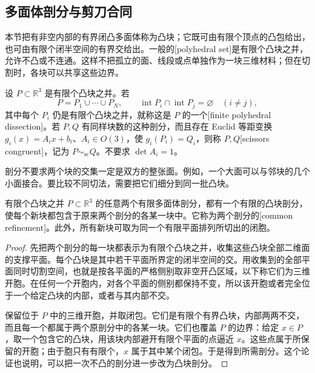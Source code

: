 \subsection{多面体剖分与剪刀合同}
\label{g1:subsec:E05:01}

本节把有非空内部的有界闭凸多面体称为凸块；它既可由有限个顶点的凸包给出，也可由有限个闭半空间的有界交给出。一般的[polyhedral set]是有限个凸块之并，允许不凸或不连通。这样不把孤立的面、线段或点单独作为一块三维材料；但在切割时，各块可以共享这些边界。

\begin{definition}
	\label{g1:def:polyhedral-scissors-congruence}
	设 \(P\subset\mathbb R^3\) 是有限个凸块之并。若
	\[
		P=P_1\cup\cdots\cup P_N,
		\qquad \operatorname{int}P_i\cap\operatorname{int}P_j=\varnothing
		\quad(i\ne j),
	\]
	其中每个 \(P_i\) 仍是有限个凸块之并，就称这是 \(P\) 的一个[finite polyhedral dissection]。若 \(P,Q\) 有同样块数的这种剖分，而且存在 Euclid 等距变换 \(g_i(x)=A_ix+b_i\)、\(A_i\in O(3)\)，使 \(g_i(P_i)=Q_i\)，则称 \(P,Q\)[scissors congruent]，记为 \(P\sim_{\mathrm{sc}}Q\)。不要求 \(\det A_i=1\)。
\end{definition}

剖分不要求两个块的交集一定是双方的整张面。例如，一个大面可以与邻块的几个小面接合。要比较不同切法，需要把它们细分到同一批凸块。

\begin{proposition}
	\label{g1:prop:polyhedral-common-refinement}
	有限个凸块之并 \(P\subset\mathbb R^3\) 的任意两个有限多面体剖分，都有一个有限的凸块剖分，使每个新块都包含于原来两个剖分的各某一块中。它称为两个剖分的[common refinement]。此外，所有新块可取为同一个有限平面排列所切出的闭胞。
\end{proposition}
\begin{proof}
	先把两个剖分的每一块都表示为有限个凸块之并，收集这些凸块全部二维面的支撑平面。每个凸块是其中若干平面所界定的闭半空间的交。用收集到的全部平面同时切割空间，也就是按各平面的严格侧别取非空开凸区域，以下称它们为三维开胞。在任何一个开胞内，对各个平面的侧别都保持不变，所以该开胞或者完全位于一个给定凸块的内部，或者与其内部不交。

	保留位于 \(P\) 中的三维开胞，并取闭包。它们是有限个有界凸块，内部两两不交，而且每一个都属于两个原剖分中的各某一块。它们也覆盖 \(P\) 的边界：给定 \(x\in P\)，取一个包含它的凸块，用该块内部避开有限个平面的点逼近 \(x\)。这些点属于所保留的开胞；由于胞只有有限个，\(x\) 属于其中某个闭包。于是得到所需剖分。这个论证也说明，可以把一次不凸的剖分进一步改为凸块剖分。
\end{proof}

